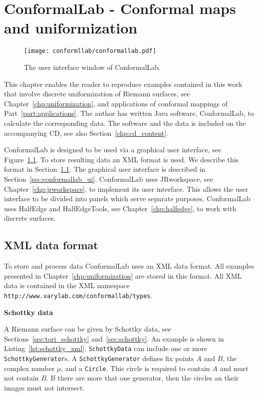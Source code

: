 \documentclass[Thesis.tex]{subfiles}
\begin{document}
\chapter{{\sc ConformalLab} - Conformal maps and uniformization}
\label{chp:conformallab}

\begin{figure}
\centering
\texttt{[image: conformllab/conformallab.pdf]}
\caption{The user interface window of {\sc ConformalLab}.}
\label{fig:conformal_window}
\end{figure}

This chapter enables the reader to reproduce examples contained in this work
that involve discrete uniformization of Riemann surfaces, see
Chapter~\ref{chp:uniformization}, and applications of conformal mappings of
Part~\ref{part:applications}. The author has written {\sc Java} software, {\sc
ConformalLab}, to calculate the corresponding data.  The software and the data
is included on the accompanying CD, see also Section~\ref{chp:cd_content}. 

{\sc ConformalLab} is designed to be used via a graphical user interface, see
Figure~\ref{fig:conformal_window}. To store resulting data an XML format is
used. We describe this format in Section~\ref{sec:conformal_data}. The
graphical user interface is described in Section~\ref{sec:conformallab_ui}.
{\sc ConformalLab} uses {\sc JRworkspace}, see Chapter~\ref{chp:jrworkspace},
to implement its user interface. This allows the user interface to be divided
into panels which serve separate purposes.  {\sc ConformalLab} uses {\sc
HalfEdge} and {\sc HalfEdgeTools}, see Chapter~\ref{chp:halfedge}, to work with
discrete surfaces.


\section{XML data format}
\label{sec:conformal_data}
To store and process data {\sc ConformalLab} uses an {\sc XML} data format.
All examples presented in Chapter~\ref{chp:uniformization} are stored in
this format.  All XML data is contained in the XML namespace {\tt
http://www.varylab.com/conformallab/types}.


{\bf Schottky data} 

A Riemann surface can be given by Schottky data, see
Sections~\ref{sec:tori_schottky} and~\ref{sec:schottky}. An example is shown in
Listing~\ref{lst:schottky_xml}. {\tt SchottkyData} can include one or more {\tt
SchottkyGenerator}s. A {\tt SchottkyGenerator} defines fix points $A$ and
$B$, the complex number $\mu$, and a {\tt Circle}. This circle is required to
contain $A$ and must not contain $B$. If there are more that one generator,
then the circles an their images must not intersect.
\end{document}
